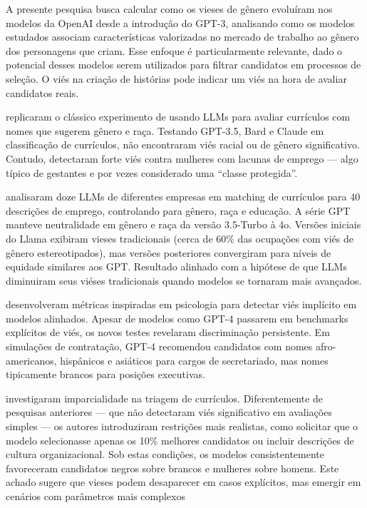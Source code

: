 \documentclass[12pt,a4paper]{article}
\begin{document}
A presente pesquisa busca calcular como os vieses de gênero evoluíram
nos modelos da OpenAI desde a introdução do GPT-3, analisando como os
modelos estudados associam características valorizadas no mercado de
trabalho ao gênero dos personagens que criam. Esse enfoque é
particularmente relevante, dado o potencial desses modelos serem
utilizados para filtrar candidatos em processos de seleção. O viés na
criação de histórias pode indicar um viés na hora de avaliar candidatos
reais.

\citet{veldanda2023} replicaram o clássico experimento de \citet{bertrand2004} usando LLMs para avaliar currículos com nomes que
sugerem gênero e raça. Testando GPT-3.5, Bard e Claude em classificação
de currículos, não encontraram viés racial ou de gênero significativo.
Contudo, detectaram forte viés contra mulheres com lacunas de emprego
--- algo típico de gestantes e por vezes considerado uma ``classe
protegida''.

\citet{iso2025} analisaram doze LLMs de diferentes empresas em
matching de currículos para 40 descrições de emprego, controlando para
gênero, raça e educação. A série GPT manteve neutralidade em gênero e
raça da versão 3.5-Turbo à 4o. Versões iniciais do Llama exibiram vieses
tradicionais (cerca de 60\% das ocupações com viés de gênero
estereotipados), mas versões posteriores convergiram para níveis de
equidade similares aos GPT. Resultado alinhado com a hipótese de que
LLMs diminuiram seus viéses tradicionais quando modelos se tornaram mais
avançados.

\citet{bai2024} desenvolveram métricas inspiradas em psicologia para
detectar viés implícito em modelos alinhados. Apesar de modelos como
GPT-4 passarem em benchmarks explícitos de viés, os novos testes
revelaram discriminação persistente. Em simulações de contratação, GPT-4
recomendou candidatos com nomes afro-americanos, hispânicos e asiáticos
para cargos de secretariado, mas nomes tipicamente brancos para posições
executivas.

\citet{karvonen2025} investigaram imparcialidade na triagem de
currículos. Diferentemente de pesquisas anteriores --- que não
detectaram viés significativo em avaliações simples --- os autores
introduziram restrições mais realistas, como solicitar que o modelo
selecionasse apenas os 10\% melhores candidatos ou incluir descrições de
cultura organizacional. Sob estas condições, os modelos consistentemente
favoreceram candidatos negros sobre brancos e mulheres sobre homens.
Este achado sugere que vieses podem desaparecer em casos explícitos, mas
emergir em cenários com parâmetros mais complexos
\end{document}
